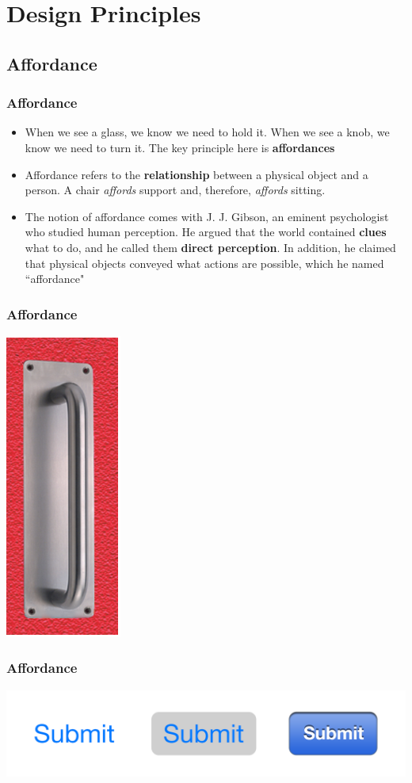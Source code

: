 \documentclass{beamer}
\begin{document}
\section{Design Principles}

\subsection{Affordance}

\begin{frame}
\frametitle{Affordance}
\begin{itemize}
	\item When we see a glass, we know we need to hold it.  When we see a knob, we know we need to turn it.  The key principle here is \textbf{affordances}
	\item Affordance refers to the \textbf{relationship} between a physical object and a person.  A chair \textit{affords} support and, therefore, \textit{affords} sitting.  
	\item The notion of affordance comes with J. J. Gibson, an eminent psychologist who studied human perception.  He argued that the world contained \textbf{clues} what to do, and he called them \textbf{direct perception}.  In addition, he claimed that physical objects conveyed what actions are possible, which he named ``affordance"
\end{itemize}
\end{frame}

\begin{frame}
\frametitle{Affordance}
\centering
\includegraphics[width=0.2\linewidth]{affordance1}
\end{frame}

\begin{frame}
\frametitle{Affordance}
\centering
\includegraphics[width=0.8\linewidth]{affordance2}
\end{frame}
\end{document}
